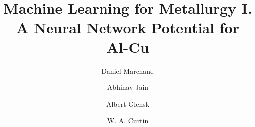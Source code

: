 \documentclass{article}
\begin{document}
\title{Machine Learning for Metallurgy I. A Neural Network Potential for Al-Cu}

\author[1]{Daniel Marchand}
\author[1]{Abhinav Jain}
\author[1]{Albert Glensk}
\author[1]{W. A. Curtin}

\maketitle

\end{document}
